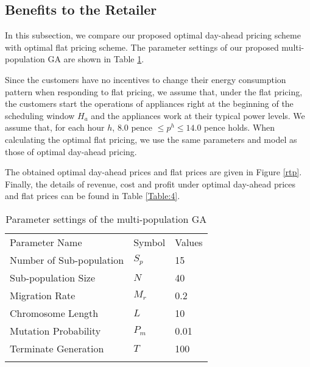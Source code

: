 \documentclass[10pt,journal]{IEEEtran}
\theoremstyle{definition}
\theoremstyle{plain} \newtheorem{theo}{Theorem} \newtheorem{prop}{Proposition}  \newtheorem{lemm}{Lemma}
\begin{document}
\subsection{Benefits to the Retailer}

In this subsection, we compare our proposed optimal day-ahead pricing scheme with optimal flat pricing scheme. The parameter settings of our proposed multi-population GA are shown in Table \ref{Table:Parameter settings of mGA}.

Since the customers have no incentives to change their energy consumption pattern when responding to flat pricing, we assume that, under the flat pricing, the customers start the operations of appliances right at the beginning of the scheduling window $H_a$ and the appliances work at their typical power levels. We assume that, for each hour $h$, $ 8.0$ pence $\leq p^h \leq 14.0 $ pence holds.  When calculating the optimal flat pricing, we use the same parameters and model as those of optimal day-ahead pricing.

The obtained optimal day-ahead prices and flat prices are given in Figure \ref{rtp}. Finally, the details of  revenue, cost and profit under optimal day-ahead prices and flat prices can be found in Table \ref{Table:4}.









 \begin{table}[!t]
  \caption{Parameter settings of the multi-population GA }
  \label{Table:Parameter settings of mGA}  
  \centering 
  \begin{tabular}{p{3.5cm}p{2cm}p{2cm}}
       \hline\noalign{\smallskip}
      Parameter Name & Symbol  & Values\\
      \noalign{\smallskip}\hline\noalign{\smallskip}
      Number of Sub-population & $S_p$ & 15 \\
      Sub-population Size & $N$ & 40 \\
      Migration Rate & $M_r$ & 0.2 \\
      Chromosome Length & $L$ & 10\\
      Mutation Probability   & $P_m$ & 0.01 \\
      Terminate Generation & $ T$ &  100 \\
      \noalign{\smallskip}\hline
    \end{tabular}
\end{table}
\end{document}
